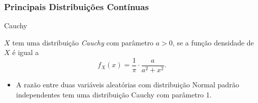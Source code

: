 \begin{frame}
\frametitle{\textbf{Principais Distribuições Contínuas}}
\baselineskip=13pt
\begin{block}{Cauchy}

$X$ tem uma distribuição {\em Cauchy} com parâmetro $a>0$, se a função densidade de $X$ é igual a
$$f_X(x)=\frac{1}{\pi}\cdot\frac{a}{a^2+x^2}.$$

\begin{itemize}
\item A razão entre duas variáveis aleatórias com distribuição Normal padrão independentes tem uma distribuição Cauchy com parâmetro 1.
\end{itemize}

\end{block}
\end{frame}
%
%
%
%
%
%
